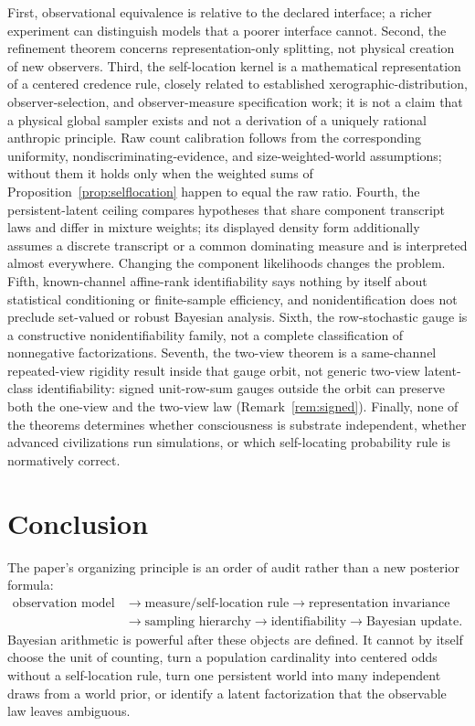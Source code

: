 \documentclass[11pt]{article}
\begin{document}
First, observational equivalence is relative to the declared interface; a richer experiment can distinguish models that a poorer interface cannot. Second, the refinement theorem concerns representation-only splitting, not physical creation of new observers. Third, the self-location kernel is a mathematical representation of a centered credence rule, closely related to established xerographic-distribution, observer-selection, and observer-measure specification work; it is not a claim that a physical global sampler exists and not a derivation of a uniquely rational anthropic principle. Raw count calibration follows from the corresponding uniformity, nondiscriminating-evidence, and size-weighted-world assumptions; without them it holds only when the weighted sums of Proposition~\ref{prop:selflocation} happen to equal the raw ratio. Fourth, the persistent-latent ceiling compares hypotheses that share component transcript laws and differ in mixture weights; its displayed density form additionally assumes a discrete transcript or a common dominating measure and is interpreted almost everywhere. Changing the component likelihoods changes the problem. Fifth, known-channel affine-rank identifiability says nothing by itself about statistical conditioning or finite-sample efficiency, and nonidentification does not preclude set-valued or robust Bayesian analysis. Sixth, the row-stochastic gauge is a constructive nonidentifiability family, not a complete classification of nonnegative factorizations. Seventh, the two-view theorem is a same-channel repeated-view rigidity result inside that gauge orbit, not generic two-view latent-class identifiability: signed unit-row-sum gauges outside the orbit can preserve both the one-view and the two-view law (Remark~\ref{rem:signed}). Finally, none of the theorems determines whether consciousness is substrate independent, whether advanced civilizations run simulations, or which self-locating probability rule is normatively correct.

\section{Conclusion}
The paper's organizing principle is an order of audit rather than a new posterior formula:
\[
\begin{aligned}
\text{observation model}
&\to\text{measure/self-location rule}\to\text{representation invariance}\\
&\to\text{sampling hierarchy}\to\text{identifiability}\to\text{Bayesian update}.
\end{aligned}
\]
Bayesian arithmetic is powerful after these objects are defined. It cannot by itself choose the unit of counting, turn a population cardinality into centered odds without a self-location rule, turn one persistent world into many independent draws from a world prior, or identify a latent factorization that the observable law leaves ambiguous.
\end{document}
